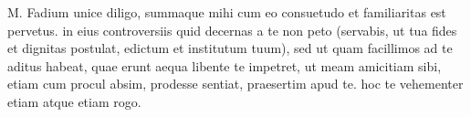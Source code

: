 


M. Fadium unice diligo, summaque mihi cum eo consuetudo et familiaritas est pervetus. in eius controversiis quid decernas a te non peto (servabis, ut tua fides et dignitas postulat, edictum et institutum tuum), sed ut quam facillimos ad te aditus habeat, quae erunt aequa libente te impetret, ut meam amicitiam sibi, etiam cum procul absim, prodesse sentiat, praesertim apud te. hoc te vehementer etiam atque etiam rogo.
